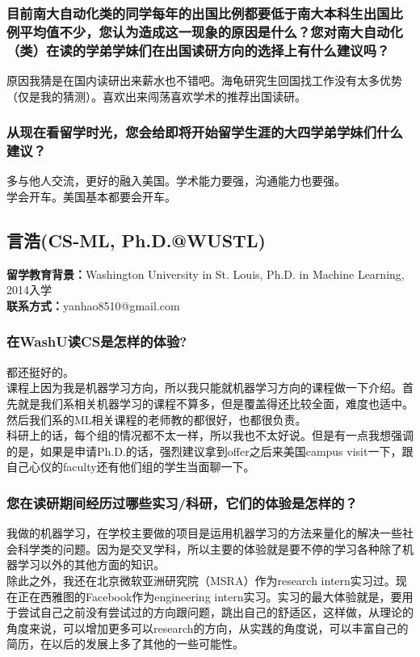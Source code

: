 \documentclass[a4paper,UTF8]{book}
\begin{document}
    \subsubsection*{目前南大自动化类的同学每年的出国比例都要低于南大本科生出国比例平均值不少，您认为造成这一现象的原因是什么？您对南大自动化（类）在读的学弟学妹们在出国读研方向的选择上有什么建议吗？}
    原因我猜是在国内读研出来薪水也不错吧。海龟研究生回国找工作没有太多优势（仅是我的猜测）。喜欢出来闯荡喜欢学术的推荐出国读研。

    \subsubsection*{从现在看留学时光，您会给即将开始留学生涯的大四学弟学妹们什么建议？}
    多与他人交流，更好的融入美国。学术能力要强，沟通能力也要强。\\
    学会开车。美国基本都要会开车。


        


\clearpage
\subsection{言浩(CS-ML, Ph.D.@WUSTL)}
    \textbf{留学教育背景：}Washington University in St. Louis, Ph.D. in Machine Learning, 2014入学\\
    \textbf{联系方式：}yanhao8510@gmail.com

    \subsubsection*{在WashU读CS是怎样的体验?}
    都还挺好的。\\
    课程上因为我是机器学习方向，所以我只能就机器学习方向的课程做一下介绍。首先就是我们系相关机器学习的课程不算多，但是覆盖得还比较全面，难度也适中。然后我们系的ML相关课程的老师教的都很好，也都很负责。\\
    科研上的话，每个组的情况都不太一样，所以我也不太好说。但是有一点我想强调的是，如果是申请Ph.D.的话，强烈建议拿到offer之后来美国campus visit一下，跟自己心仪的faculty还有他们组的学生当面聊一下。
    \subsubsection*{您在读研期间经历过哪些实习/科研，它们的体验是怎样的？}
    我做的机器学习，在学校主要做的项目是运用机器学习的方法来量化的解决一些社会科学类的问题。因为是交叉学科，所以主要的体验就是要不停的学习各种除了机器学习以外的其他方面的知识。\\
    除此之外，我还在北京微软亚洲研究院（MSRA）作为research intern实习过。现在正在西雅图的Facebook作为engineering intern实习。实习的最大体验就是，要用于尝试自己之前没有尝试过的方向跟问题，跳出自己的舒适区，这样做，从理论的角度来说，可以增加更多可以research的方向，从实践的角度说，可以丰富自己的简历，在以后的发展上多了其他的一些可能性。
\end{document}
